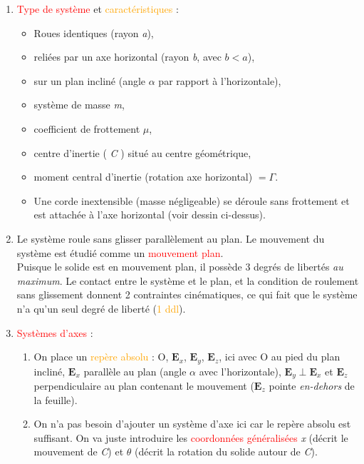 \documentclass[a4paper]{article}
\begin{document}
\begin{enumerate}

\item \textcolor{red}{Type de système} et \textcolor{orange}{caractéristiques} : 
\begin{itemize}
    \item Roues identiques (rayon \emph{a}),
    \item reliées par un axe horizontal (rayon \emph{b}, avec $ b < a $),
    \item sur un plan incliné (angle $ \alpha $ par rapport à l'horizontale),
    \item système de masse \emph{m},
    \item coefficient de frottement $ \mu $,
    \item centre d'inertie ( \emph{C} ) situé au centre géométrique,
    \item moment central d'inertie (rotation axe horizontal) $ = \Gamma $.
    \item Une corde inextensible (masse négligeable) se déroule sans frottement et est attachée à l'axe horizontal (voir dessin ci-dessus).
\end{itemize}

\item Le système roule sans glisser parallèlement au plan. Le mouvement du système est étudié comme un \textcolor{red}{mouvement plan}. \\
Puisque le solide est en mouvement plan, il possède 3 degrés de libertés \emph{au maximum}. Le contact entre le système et le plan, et la condition de roulement sans glissement donnent 2 contraintes cinématiques, ce qui fait que le système n'a qu'un seul degré de liberté (\textcolor{orange}{1 ddl}).

\item \textcolor{red}{Systèmes d'axes} : 
\begin{enumerate}
    \item On place un \textcolor{orange}{repère absolu} : O, $ \textbf{E}_x $, $ \textbf{E}_y $, $ \textbf{E}_z $, ici avec O au pied du plan incliné, $ \textbf{E}_x $ parallèle au plan (angle $ \alpha $ avec l'horizontale), $ \textbf{E}_y \perp \textbf{E}_x $ et $ \textbf{E}_z $ perpendiculaire au plan contenant le mouvement ($ \textbf{E}_z $ pointe \emph{en-dehors} de la feuille).
    \item On n'a pas besoin d'ajouter un système d'axe ici car le repère absolu est suffisant. On va juste introduire les \textcolor{red}{coordonnées généralisées} \emph{x} (décrit le mouvement de \emph{C}) et $ \theta $ (décrit la rotation du solide autour de \emph{C}).
\end{enumerate}


\end{enumerate}
\end{document}
